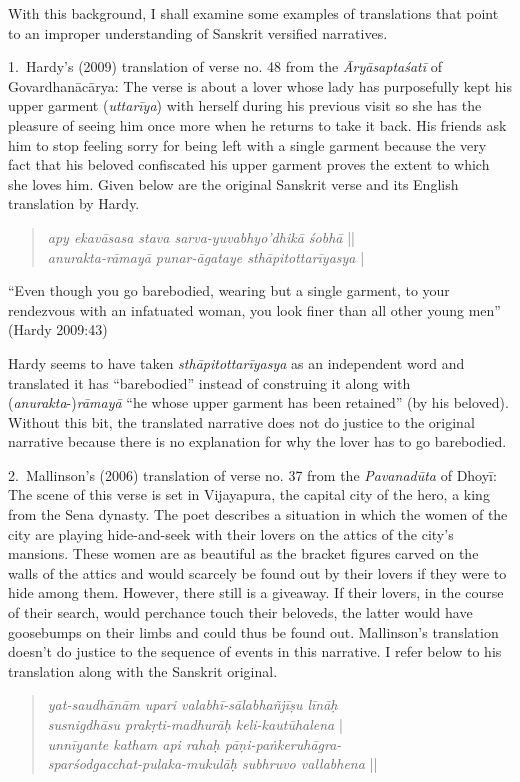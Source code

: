 With this background, I shall examine some examples of translations that point to an improper understanding of Sanskrit versified narratives.  

1.~Hardy’s (2009) translation of verse no. 48 from the \textsl{Āryāsaptaśatī} of Govardhanācārya: The verse is about a lover whose lady has purposefully kept his upper garment (\textsl{uttarīya}) with herself during his previous visit so she has the pleasure of seeing him once more when he returns to take it back. His friends ask him to stop feeling sorry for being left with a single garment because the very fact that his beloved confiscated his upper garment proves the extent to which she loves him. Given below are the original Sanskrit verse and its English translation by Hardy. 
\begin{quote}
\textsl{apy ekavāsasa stava sarva-yuvabhyo’dhikā śobhā}  ||\\
\textsl{anurakta-rāmayā punar-āgataye sthāpitottarīyasya} |
\end{quote}

\begin{myquote}
“Even though you go barebodied, wearing but a single garment, to your rendezvous with an infatuated woman, you look finer than all other young men” 
\hfill(Hardy 2009:43)
\end{myquote}

Hardy seems to have taken \textsl{sthāpitottarīyasya }as an independent word and translated it has “barebodied” instead of construing it along with (\textsl{anurakta}-)\textsl{rāmayā}  “he whose upper garment has been retained” (by his beloved). Without this bit, the translated narrative does not do justice to the original narrative because there is no explanation for why the lover has to go barebodied.

2.~Mallinson’s (2006) translation of verse no. 37 from the \textsl{Pavanadūta} of Dhoyī:  The scene of this verse is set in Vijayapura, the capital city of the hero, a king from the Sena dynasty. The poet describes a situation in which the women of the city are playing hide-and-seek with their lovers on the attics of the city's mansions. These women are as beautiful as the bracket figures carved on the walls of the attics and would scarcely be found out by their lovers if they were to hide among them. However, there still is a giveaway. If their lovers, in the course of their search, would perchance touch their beloveds, the latter would have goosebumps on their limbs and could thus be found out. Mallinson's translation doesn't do justice to the sequence of events in this narrative. I refer below to his translation along with the Sanskrit original.
\begin{quote}
\textsl{yat-saudhānām upari valabhī-sālabhañjīṣu līnāḥ}\\
\textsl{susnigdhāsu prakṛti-madhurāḥ keli-kautūhalena} |\\
\textsl{unnīyante katham api rahaḥ pāṇi-paṅkeruhāgra-}\\
\textsl{sparśodgacchat-pulaka-mukulāḥ subhruvo vallabhena} ||
\end{quote}

